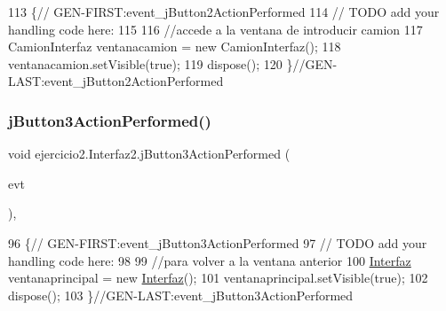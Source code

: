 \begin{DoxyCode}
113                                                                          \{\textcolor{comment}{//
      GEN-FIRST:event\_jButton2ActionPerformed}
114         \textcolor{comment}{// TODO add your handling code here:}
115         
116         \textcolor{comment}{//accede a la ventana de introducir camion}
117         CamionInterfaz ventanacamion = \textcolor{keyword}{new} CamionInterfaz();
118         ventanacamion.setVisible(\textcolor{keyword}{true});
119         dispose();
120     \}\textcolor{comment}{//GEN-LAST:event\_jButton2ActionPerformed}
\end{DoxyCode}
\mbox{\label{classejercicio2_1_1_interfaz2_a5a9fe11c8a0e571dc802502ae085bb59}} 
\subsubsection{\texorpdfstring{j\+Button3\+Action\+Performed()}{jButton3ActionPerformed()}}
{\footnotesize\ttfamily void ejercicio2.\+Interfaz2.\+j\+Button3\+Action\+Performed (\begin{DoxyParamCaption}\item[{java.\+awt.\+event.\+Action\+Event}]{evt }\end{DoxyParamCaption})\hspace{0.3cm}{\ttfamily [inline]}, {\ttfamily [private]}}


\begin{DoxyCode}
96                                                                          \{\textcolor{comment}{//
      GEN-FIRST:event\_jButton3ActionPerformed}
97         \textcolor{comment}{// TODO add your handling code here:}
98         
99         \textcolor{comment}{//para volver a la ventana anterior}
100         \mbox{\hyperlink{namespace_interfaz}{Interfaz}} ventanaprincipal = \textcolor{keyword}{new} \mbox{\hyperlink{namespace_interfaz}{Interfaz}}();
101         ventanaprincipal.setVisible(\textcolor{keyword}{true});
102         dispose();
103     \}\textcolor{comment}{//GEN-LAST:event\_jButton3ActionPerformed}
\end{DoxyCode}
\mbox{\label{classejercicio2_1_1_interfaz2_a3300b7f5dc73c64e416e9616a3b4ae19}} 
